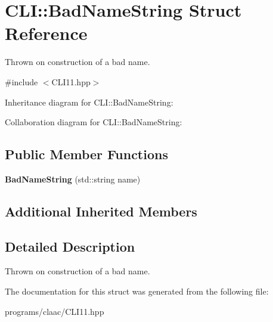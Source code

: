 \hypertarget{struct_c_l_i_1_1_bad_name_string}{}\section{C\+LI\+:\+:Bad\+Name\+String Struct Reference}
\label{struct_c_l_i_1_1_bad_name_string}


Thrown on construction of a bad name.  




{\ttfamily \#include $<$C\+L\+I11.\+hpp$>$}



Inheritance diagram for C\+LI\+:\+:Bad\+Name\+String\+:


Collaboration diagram for C\+LI\+:\+:Bad\+Name\+String\+:
\subsection*{Public Member Functions}
\begin{DoxyCompactItemize}
\item 
\mbox{\label{struct_c_l_i_1_1_bad_name_string_ab1b309894dd5d3674a62c4fed7615fe9}} 
{\bfseries Bad\+Name\+String} (std\+::string name)
\end{DoxyCompactItemize}
\subsection*{Additional Inherited Members}


\subsection{Detailed Description}
Thrown on construction of a bad name. 

The documentation for this struct was generated from the following file\+:\begin{DoxyCompactItemize}
\item 
programs/claac/C\+L\+I11.\+hpp\end{DoxyCompactItemize}

